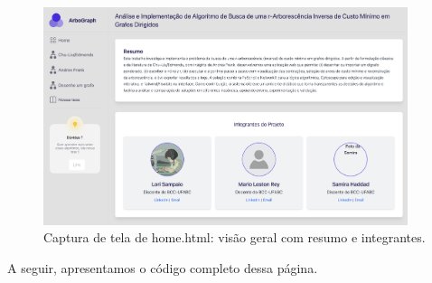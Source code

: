 \documentclass[12pt,a4paper]{article}
\def\texttt#1{#1}%
\begin{document}
\begin{figure}[H]\centering
    \includegraphics[width=0.95\textwidth]{../assets/homehtml.png}
    \caption{Captura de tela de \texttt{home.html}: visão geral com resumo e integrantes.}
    \label{fig:home_html_screenshot}
\end{figure}


A seguir, apresentamos o código completo dessa página.
\end{document}
